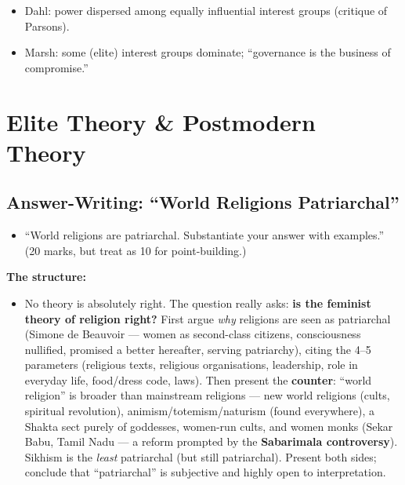 \begin{QuickRevision}
\begin{itemize}
\item Dahl: power dispersed among equally influential interest groups (critique of Parsons).
\item Marsh: some (elite) interest groups dominate; ``governance is the business of compromise.''
\end{itemize}
\end{QuickRevision}

\sectiondivider

\section{Elite Theory \& Postmodern Theory}

\subsection{Answer-Writing: ``World Religions Patriarchal''}

\begin{PYQLink}
\begin{itemize}
\item ``World religions are patriarchal. Substantiate your answer with examples.'' (20 marks, but treat as 10 for point-building.)
\end{itemize}
\end{PYQLink}

\begin{KeyConcept}
\textbf{The structure:}
\begin{itemize}
\item No theory is absolutely right. The question really asks: \textbf{is the feminist theory of religion right?} First argue \textit{why} religions are seen as patriarchal (Simone de Beauvoir --- women as second-class citizens, consciousness nullified, promised a better hereafter, serving patriarchy), citing the 4--5 parameters (religious texts, religious organisations, leadership, role in everyday life, food/dress code, laws). Then present the \textbf{counter}: ``world religion'' is broader than mainstream religions --- new world religions (cults, spiritual revolution), animism/totemism/naturism (found everywhere), a Shakta sect purely of goddesses, women-run cults, and women monks (Sekar Babu, Tamil Nadu --- a reform prompted by the \textbf{Sabarimala controversy}). Sikhism is the \textit{least} patriarchal (but still patriarchal). Present both sides; conclude that ``patriarchal'' is subjective and highly open to interpretation.
\end{itemize}
\end{KeyConcept}

